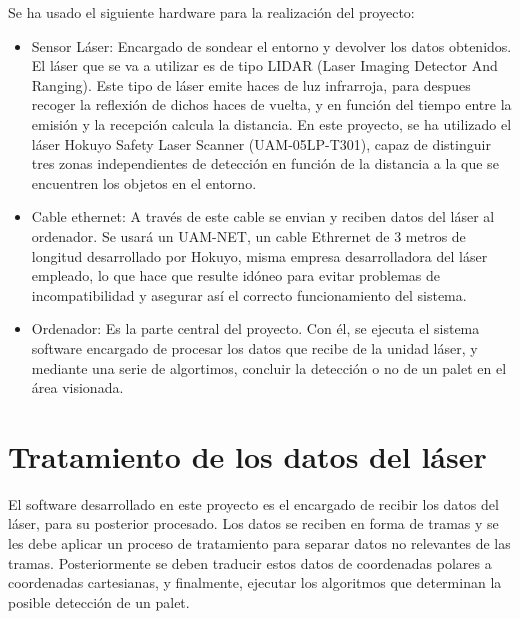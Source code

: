 Se ha usado el siguiente hardware para la realización del proyecto:
\begin{itemize}
	\item Sensor Láser: Encargado de sondear el entorno y devolver los datos obtenidos. El láser que se va a utilizar es de tipo LIDAR (Laser Imaging Detector And Ranging).
Este tipo de láser emite haces de luz infrarroja, para despues recoger la reflexión de dichos haces de vuelta, y en función del tiempo entre la emisión y la recepción calcula la distancia.
En este proyecto, se ha utilizado el láser Hokuyo Safety Laser Scanner (UAM-05LP-T301), capaz de distinguir tres zonas independientes de detección en función de la distancia a la que se encuentren los objetos en el entorno.
	\item Cable ethernet: A través de este cable se envian y reciben datos del láser al ordenador. Se usará un UAM-NET, un cable Ethrernet de 3 metros de longitud desarrollado por Hokuyo, misma empresa desarrolladora del láser empleado, lo que hace que resulte idóneo para evitar problemas de incompatibilidad y asegurar así el correcto funcionamiento del sistema.
	\item Ordenador: Es la parte central del proyecto. Con él, se ejecuta el sistema software encargado de procesar los datos que recibe de la unidad láser, y mediante una serie de algortimos, concluir la detección o no de un palet en el área visionada.
\end{itemize}

\section{Tratamiento de los datos del láser}
El software desarrollado en este proyecto es el encargado de recibir los datos del láser, para su posterior procesado. Los datos se reciben en forma de tramas y se les debe aplicar un proceso de tratamiento para separar datos no relevantes de las tramas. Posteriormente se deben traducir estos datos de coordenadas polares a coordenadas cartesianas, y finalmente, ejecutar los algoritmos que determinan la posible detección de un palet.

